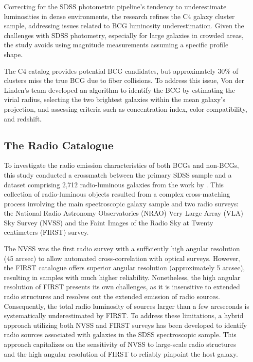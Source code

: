 Correcting for the SDSS photometric pipeline's tendency to underestimate luminosities in dense environments, the research refines the C4 galaxy cluster sample, addressing issues related to BCG luminosity underestimation. Given the challenges with SDSS photometry, especially for large galaxies in crowded areas, the study avoids using magnitude measurements assuming a specific profile shape.

The C4 catalog provides potential BCG candidates, but approximately $30\% $ of clusters miss the true BCG due to fiber collisions. To address this issue,  Von der Linden's team developed an algorithm to identify the BCG by estimating the virial radius, selecting the two brightest galaxies within the mean galaxy's projection, and assessing criteria such as concentration index, color compatibility, and redshift.

\subsection{The Radio Catalogue}
To investigate the radio emission characteristics of both BCGs and non-BCGs, this study conducted a crossmatch between the primary SDSS sample and a dataset comprising 2,712 radio-luminous galaxies from the work by \cite{2005MNRAS.362....9B}. This collection of radio-luminous objects resulted from a complex cross-matching process involving the main spectroscopic galaxy sample and two radio surveys: the National Radio Astronomy Observatories (NRAO) Very Large Array (VLA) Sky Survey (NVSS) \cite{1998AJ....115.1693C} and the Faint Images of the Radio Sky at Twenty centimeters (FIRST) survey. \cite{1995ApJ...450..559B}

The NVSS was the first radio survey with a sufficiently high angular resolution (45 arcsec) to allow automated cross-correlation with optical surveys. However, the FIRST catalogue offers superior angular resolution (approximately 5 arcsec), resulting in samples with much higher reliability. Nonetheless, the high angular resolution of FIRST presents its own challenges, as it is insensitive to extended radio structures and resolves out the extended emission of radio sources. Consequently, the total radio luminosity of sources larger than a few arcseconds is systematically underestimated by FIRST. To address these limitations, a hybrid approach utilizing both NVSS and FIRST surveys has been developed to identify radio sources associated with galaxies in the SDSS spectroscopic sample. This approach capitalizes on the sensitivity of NVSS to large-scale radio structures and the high angular resolution of FIRST to reliably pinpoint the host galaxy.

